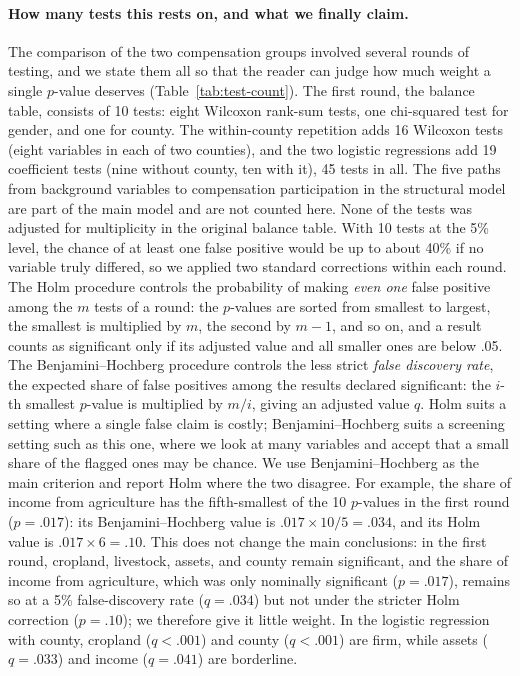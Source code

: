 \paragraph{How many tests this rests on, and what we finally claim.}
The comparison of the two compensation groups involved several rounds of
testing, and we state them all so that the reader can judge how much weight a
single $p$-value deserves (Table~\ref{tab:test-count}). The first round, the
balance table, consists of 10 tests: eight Wilcoxon rank-sum tests, one
chi-squared test for gender, and one for county. The within-county repetition
adds 16 Wilcoxon tests (eight variables in each of two counties), and the two
logistic regressions add 19 coefficient tests (nine without county, ten with
it), 45 tests in all. The five paths from background variables to compensation
participation in the structural model are part of the main model and are not
counted here. None of the tests was adjusted for multiplicity in the original
balance table. With 10 tests at the 5\% level, the chance of at least one
false positive would be up to about 40\% if no variable truly differed, so
we applied two standard corrections within each round. The Holm procedure
\citep{Holm1979} controls the probability of making \emph{even one} false
positive among the $m$ tests of a round: the $p$-values are sorted from
smallest to largest, the smallest is multiplied by $m$, the second by $m-1$,
and so on, and a result counts as significant only if its adjusted value and
all smaller ones are below .05. The Benjamini--Hochberg procedure
\citep{Benjamini1995} controls the less strict \emph{false discovery rate},
the expected share of false positives among the results declared
significant: the $i$-th smallest $p$-value is multiplied by $m/i$, giving an
adjusted value $q$. Holm suits a setting where a single false claim is
costly; Benjamini--Hochberg suits a screening setting such as this one,
where we look at many variables and accept that a small share of the flagged
ones may be chance. We use Benjamini--Hochberg as the main criterion and
report Holm where the two disagree. For example, the share of income from
agriculture has the fifth-smallest of the 10 $p$-values in the first round
($p = .017$): its Benjamini--Hochberg value is $.017 \times 10/5 = .034$, and
its Holm value is $.017 \times 6 = .10$. This does not change the
main conclusions: in the first round, cropland, livestock, assets, and county
remain significant, and the share of income from agriculture, which was only
nominally significant ($p = .017$), remains so at a 5\% false-discovery rate
($q = .034$) but not under the stricter Holm correction ($p = .10$); we
therefore give it little weight. In the logistic regression with county,
cropland ($q < .001$) and county ($q < .001$) are firm, while assets
($q = .033$) and income ($q = .041$) are borderline.

